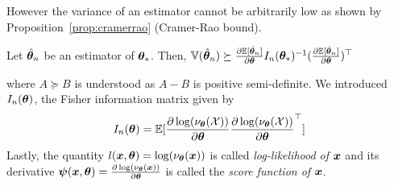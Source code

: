 However the variance of an estimator cannot be arbitrarily low as shown by
Proposition~\ref{prop:cramerrao} (Cramer-Rao bound).
\begin{proposition}
  \label{prop:cramerrao}
  Let $\hat{\boldsymbol{\theta}}_n$ be an estimator of $\boldsymbol{\theta}_*$.
  Then, $\mathbb{V}(\hat{\boldsymbol{\theta}}_n) \succeq
  \frac{ \partial \mathbb{E}[\hat{\boldsymbol{\theta}}_n]}{\partial \boldsymbol{\theta}}I_n(\boldsymbol{\theta}_*)^{-1} (\frac{ \partial \mathbb{E}[\hat{\boldsymbol{\theta}}_n]}{\partial \boldsymbol{\theta}})^{\top}$
\end{proposition}
where $A \succeq B$ is understood as $A-B$ is positive semi-definite.
We introduced $I_n(\boldsymbol{\theta})$, the Fisher information matrix given by
\begin{align}
  I_n(\boldsymbol{\theta}) = \mathbb{E}[\frac{ \partial \log(\nu_{\boldsymbol{\theta}}(\mathcal{X}))}{\partial \boldsymbol{\theta}} \frac{ \partial \log(\nu_{\boldsymbol{\theta}}(\mathcal{X}))}{\partial \boldsymbol{\theta}}^{\top}]
\end{align}
Lastly, the quantity $l(\boldsymbol{x}, \boldsymbol{\theta}) = \log(\nu_{\boldsymbol{\theta}}(\boldsymbol{x}))$ is called
\emph{log-likelihood of $\boldsymbol{x}$} and its derivative $\boldsymbol{\psi}(\boldsymbol{x}, \boldsymbol{\theta}) =
\frac{ \partial \log(\nu_{\boldsymbol{\theta}}(\boldsymbol{x}))}{\partial \boldsymbol{\theta}}$ is called the \emph{score
  function of $\boldsymbol{x}$}. 
